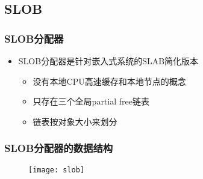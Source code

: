 \subsection{SLOB} %
\begin{frame}[plain,t]    
    \frametitle{SLOB分配器}
    \begin{itemize}
        \item SLOB分配器是针对嵌入式系统的SLAB简化版本
        \begin{itemize}
            \item 没有本地CPU高速缓存和本地节点的概念
            \item 只存在三个全局partial free链表
            \item 链表按对象大小来划分
        \end{itemize}
    \end{itemize}
\end{frame}
\begin{frame}[plain,t]    
    \frametitle{SLOB分配器的数据结构}
    \begin{figure}
        \centering
        \texttt{[image: slob]}
    \end{figure}

\end{frame}
